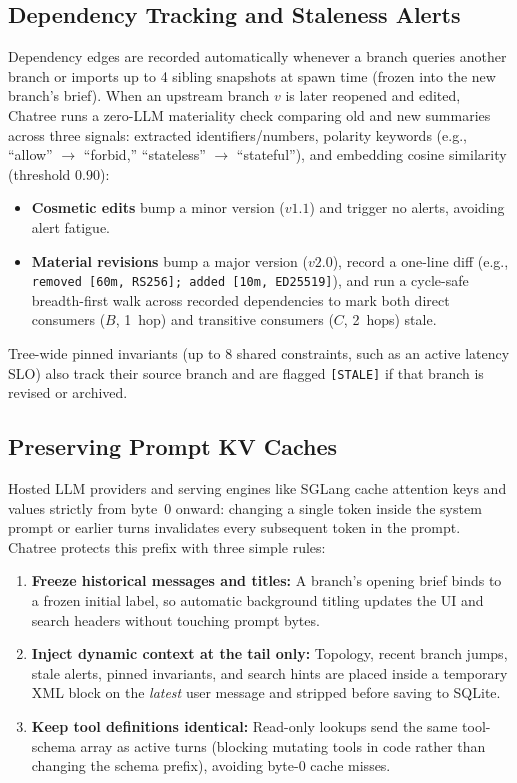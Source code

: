 \documentclass[10pt,twocolumn]{article}
\begin{document}
\subsection{Dependency Tracking and Staleness Alerts}
Dependency edges are recorded automatically whenever a branch queries another branch or imports up to 4 sibling snapshots at spawn time (frozen into the new branch's brief). When an upstream branch $v$ is later reopened and edited, Chatree runs a zero-LLM materiality check comparing old and new summaries across three signals: extracted identifiers/numbers, polarity keywords (e.g., ``allow'' $\to$ ``forbid,'' ``stateless'' $\to$ ``stateful''), and embedding cosine similarity (threshold $0.90$):
\begin{itemize}
  \item \textbf{Cosmetic edits} bump a minor version ($v1.1$) and trigger no alerts, avoiding alert fatigue.
  \item \textbf{Material revisions} bump a major version ($v2.0$), record a one-line diff (e.g., \texttt{removed [60m, RS256]; added [10m, ED25519]}), and run a cycle-safe breadth-first walk across recorded dependencies to mark both direct consumers ($B$, 1~hop) and transitive consumers ($C$, 2~hops) stale.
\end{itemize}
Tree-wide pinned invariants (up to 8 shared constraints, such as an active latency SLO) also track their source branch and are flagged \texttt{[STALE]} if that branch is revised or archived.

\subsection{Preserving Prompt KV Caches}
Hosted LLM providers and serving engines like SGLang \citep{zheng2024sglang} cache attention keys and values strictly from byte~0 onward: changing a single token inside the system prompt or earlier turns invalidates every subsequent token in the prompt. Chatree protects this prefix with three simple rules:
\begin{enumerate}
  \item \textbf{Freeze historical messages and titles:} A branch's opening brief binds to a frozen initial label, so automatic background titling updates the UI and search headers without touching prompt bytes.
  \item \textbf{Inject dynamic context at the tail only:} Topology, recent branch jumps, stale alerts, pinned invariants, and search hints are placed inside a temporary XML block on the \emph{latest} user message and stripped before saving to SQLite.
  \item \textbf{Keep tool definitions identical:} Read-only lookups send the same tool-schema array as active turns (blocking mutating tools in code rather than changing the schema prefix), avoiding byte-0 cache misses.
\end{enumerate}
\end{document}
